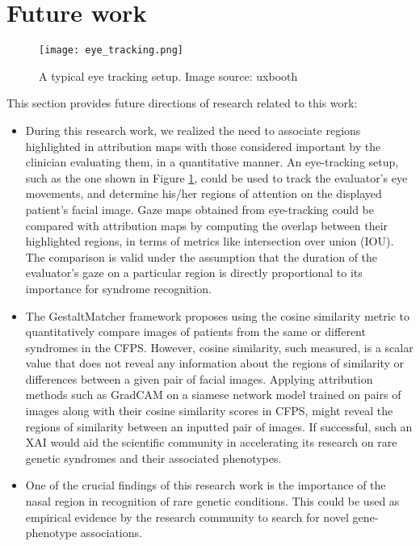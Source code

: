 \documentclass[../report.tex]{subfiles}
\begin{document}
    \section{Future work}
    \begin{figure}[H]
    	\centering     
    	\texttt{[image: eye\_tracking.png]}
    	\caption[A typical eye tracking setup]{A typical eye tracking setup. Image source: uxbooth\protect\footnotemark}
    	\label{fig_eye_track}
    \end{figure}
    This section provides future directions of research related to this work:
    \begin{itemize}
    	\item  During this research work, we realized the need to associate regions highlighted in attribution maps with those considered important by the clinician evaluating them, in a quantitative manner. An eye-tracking setup, such as the one shown in Figure \ref{fig_eye_track}, could be used to track the evaluator's eye movements, and determine his/her regions of attention on the displayed patient's facial image. Gaze maps obtained from eye-tracking could be compared with attribution maps by computing the overlap between their highlighted regions, in terms of metrics like intersection over union (IOU). The comparison is valid under the assumption that the duration of the evaluator's gaze on a particular region is directly proportional to its importance for syndrome recognition. 
    	\item The GestaltMatcher framework proposes using the cosine similarity metric to quantitatively compare images of patients from the same or different syndromes in the CFPS. However, cosine similarity, such measured, is a scalar value that does not reveal any information about the regions of similarity or differences between a given pair of facial images. Applying attribution methods such as GradCAM on a siamese network \cite{taigman2014deepface} model trained on pairs of images along with their cosine similarity scores in CFPS, might reveal the regions of similarity between an inputted pair of images. If successful, such an XAI would aid the scientific community in accelerating its research on rare genetic syndromes and their associated phenotypes.
    	\item  One of the crucial findings of this research work is the importance of the nasal region in recognition of rare genetic conditions. This could be used as empirical evidence by the research community to search for novel gene-phenotype associations.
    
    \end{itemize}
\end{document}
